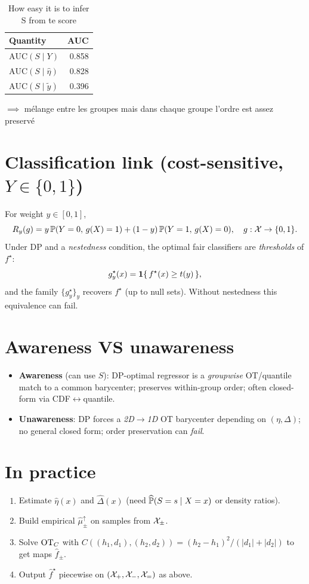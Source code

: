 \documentclass[11pt]{article}
\begin{document}
\begin{table}[t]
  \centering
  \begin{tabular}{lr}
  \toprule
  Quantity & AUC \\
  \midrule
  $\mathrm{AUC}(S\mid Y)$ & 0.858 \\
  $\mathrm{AUC}(S\mid \hat{\eta})$ & 0.828 \\
  $\mathrm{AUC}(S\mid \tilde{y})$ & 0.396 \\
  \bottomrule
  \end{tabular}
  \caption[Leakage AUC summary.]{How easy it is to infer S from te score}
  \label{tab:auc}
\end{table}

  $\implies$ mélange entre les groupes mais dans chaque groupe l'ordre est assez preservé 

  
\section{Classification link (cost-sensitive, $Y\in\{0,1\}$)}
For weight $y\in[0,1]$,
\begin{equation}
R_y(g)=y\,\mathbb{P}(Y=0,\,g(X)=1)+(1-y)\,\mathbb{P}(Y=1,\,g(X)=0),\quad g:\mathcal{X}\to\{0,1\}.
\end{equation}
Under DP and a \emph{nestedness} condition, the optimal fair classifiers are \emph{thresholds} of $f^\star$:
\begin{equation}
g_y^\star(x)=\mathbf{1}\{\,f^\star(x)\ge t(y)\,\},
\end{equation}
and the family $\{g_y^\star\}_y$ recovers $f^\star$ (up to null sets). Without nestedness this equivalence can fail.

\section{Awareness VS unawareness }
\begin{itemize}
  \item \textbf{Awareness} (can use $S$): DP-optimal regressor is a \emph{groupwise} OT/quantile match to a common barycenter; preserves within-group order; often closed-form via CDF$\leftrightarrow$quantile.
  \item \textbf{Unawareness}: DP forces a \emph{2D$\to$1D} OT barycenter depending on $(\eta,\Delta)$; no general closed form; order preservation can \emph{fail}.
\end{itemize}

\section{ In practice }
\begin{enumerate}
  \item Estimate $\widehat\eta(x)$ and $\widehat\Delta(x)$ (need $\widehat{\mathbb{P}}(S=s\mid X=x)$ or density ratios).
  \item Build empirical $\widehat\mu_\pm^{\uparrow}$ on samples from $\mathcal{X}_\pm$.
  \item Solve $\operatorname{OT}_C$ with $C((h_1,d_1),(h_2,d_2))={(h_2-h_1)^2}/{(|d_1|+|d_2|)}$ to get maps $\hat f_\pm$.
  \item Output $\hat f^\star$ piecewise on $(\mathcal{X}_+,\mathcal{X}_-,\mathcal{X}_=)$ as above.
\end{enumerate}
\end{document}
